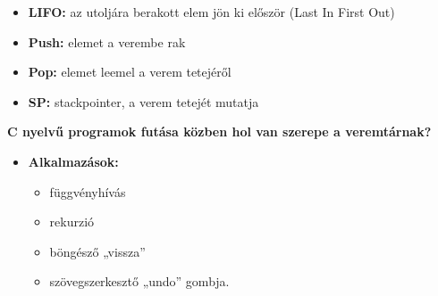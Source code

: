 \documentclass[11pt,a4paper]{article}
\begin{document}
\begin{tcolorbox}[colback=blue!5!white,colframe=blue!50!black,title= 22. Ismertesse a bináris fák szerkezetét és tárolási lehetőségeit számítógépen!]
\begin{center}
\begin{tabular}{ c c }
                    \end{tabular}
                \end{center}
                \begin{center}
                \end{center}
            \end{tcolorbox}
            
            \begin{tcolorbox}[colback=blue!5!white,colframe=blue!50!black,title= 23. Ismertesse a veremtár működését!]
                \begin{itemize}
                    \item \textbf{LIFO:} az utoljára berakott elem jön ki először (Last In First Out)
                    \item \textbf{Push:} elemet a verembe rak
                    \item \textbf{Pop:} elemet leemel a verem tetejéről
                    \item \textbf{SP:} stackpointer, a verem tetejét mutatja
                \end{itemize}
                \textbf{C nyelvű programok futása közben hol van szerepe a veremtárnak?}
                \begin{itemize}
                    \item \textbf{Alkalmazások:}
                    \begin{itemize}
                        \item függvényhívás
                        \item rekurzió
                        \item böngésző „vissza”
                        \item szövegszerkesztő „undo” gombja.
                    \end{itemize}
                \end{itemize}
            \end{tcolorbox}
            
\end{document}
